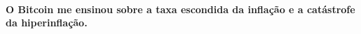 \paragraph{O Bitcoin me ensinou sobre a taxa escondida da inflação e a catástrofe da hiperinflação.}

%
%
%
%
%
